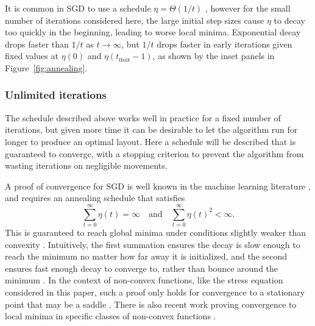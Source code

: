 It is common in SGD to use a schedule
$\eta = \Theta(1/t)$ \cite{Darken1992},
however for the small number of iterations considered here, the large initial step sizes cause $\eta$ to decay too quickly in the beginning, leading to worse local minima. 
Exponential decay drops faster than $1/t$ as $t\rightarrow\infty$, but $1/t$ drops faster in early iterations given fixed values at $\eta(0)$ and $\eta(t_{\max}-1)$, as shown by the inset panels in Figure~\ref{fig:annealing}.

\subsubsection{Unlimited iterations}
The schedule described above works well in practice for a fixed number of iterations, but given more time it can be desirable to let the algorithm run for longer to produce an optimal layout.
Here a schedule will be described that is guaranteed to converge, with a stopping criterion to prevent the algorithm from wasting iterations on negligible movements.

A proof of convergence for SGD is well known in the machine learning literature \cite{Bottou2012}, and requires an annealing schedule that satisfies
\begin{equation}
  \sum_{t=0}^{\infty}\eta(t) = \infty
  \quad \text{and} \quad
  \sum_{t=0}^{\infty}\eta(t)^2 < \infty.
  \label{eq:convergence}
\end{equation}
This is guaranteed to reach global minima under conditions slightly weaker than convexity \cite{Bottou1998}.
Intuitively, the first summation ensures the decay is slow enough to reach the minimum no matter how far away it is initialized, and the second ensures fast enough decay to converge to, rather than bounce around the minimum \cite{Welling2011}.
In the context of non-convex functions, like the stress equation considered in this paper, such a proof only holds for convergence to a stationary point that may be a saddle \cite{Bottou1998}.
There is also recent work proving convergence to local minima in specific classes of non-convex functions \cite{Ge2015}.

